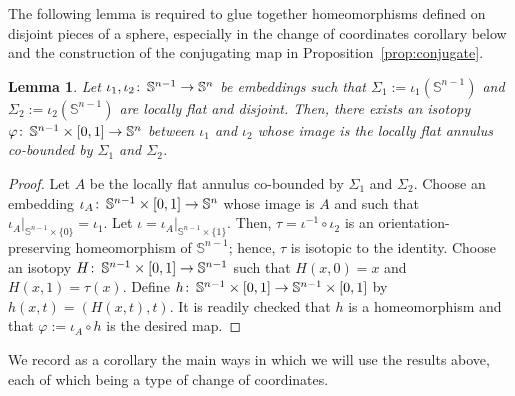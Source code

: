 \documentclass[microtype]{gtpart}
\newcommand{\vp}{\varphi}
\DeclareMathOperator{\Homeo}{Homeo}
\renewcommand{\co}{\colon\thinspace}
\newtheorem{Lem}[Thm]{Lemma}
\theoremstyle{definition}
\numberwithin{equation}{section}
\begin{document}
The following lemma is required to glue together homeomorphisms defined on disjoint pieces of a sphere, especially in the change of coordinates corollary below and the construction of the conjugating map in Proposition~\ref{prop:conjugate}.

\begin{Lem}
\label{lem:isotopy}
Let \( \iota_1, \iota_2 \co \mathbb S^{n-1} \to \mathbb S^{n} \) be embeddings such that \( \Sigma_1 := \iota_1(\mathbb S^{n-1}) \) and \( \Sigma_2 := \iota_2(\mathbb S^{n-1}) \) are locally flat and disjoint. 
Then, there exists an isotopy \( \vp \co \mathbb S^{n-1} \times [0,1] \to \mathbb S^n \) between \( \iota_1 \) and \( \iota_2 \) whose image is the locally flat annulus co-bounded by \( \Sigma_1 \) and \( \Sigma_2 \). %
\end{Lem}

\begin{proof}
Let \( A \) be the locally flat annulus co-bounded by \( \Sigma_1 \) and \( \Sigma_2 \). 
Choose an embedding \( \iota_A \co \mathbb S^{n-1} \times [0,1] \to \mathbb S^n \) whose image is \( A \) and such that \( \iota_A|_{\mathbb S^{n-1}\times\{0\}} = \iota_1 \).
Let \( \iota = \iota_A|_{\mathbb S^{n-1}\times\{1\}} \).
Then,  \( \tau = \iota^{-1}\circ  \iota_2 \) is an orientation-preserving homeomorphism of \( \mathbb S^{n-1} \); hence, \( \tau \) is isotopic to the identity. 
Choose an isotopy \( H\co \mathbb S^{n-1} \times [0,1] \to \mathbb S^{n-1} \) such that \( H(x,0) = x \) and \( H(x,1) = \tau(x) \). 
Define \( h \co \mathbb S^{n-1} \times [0,1] \to \mathbb S^{n-1} \times [0,1] \) by \( h(x,t) = (H(x,t), t) \).
It is readily checked that \( h \) is a homeomorphism and that \( \vp:=  \iota_A\circ h \) is the desired map.
\end{proof}

We record as a corollary the main ways in which we will use the results above, each of which being a type of change of coordinates.
\end{document}
